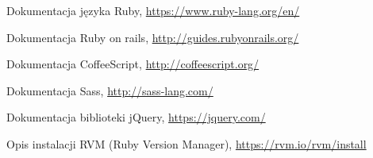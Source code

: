  Dokumentacja języka Ruby, \url{https://www.ruby-lang.org/en/}

 Dokumentacja Ruby on rails, \url{http://guides.rubyonrails.org/}

 Dokumentacja CoffeeScript, \url{http://coffeescript.org/}

 Dokumentacja Sass, \url{http://sass-lang.com/}

 Dokumentacja biblioteki jQuery, \url{https://jquery.com/}

 Opis instalacji RVM (Ruby Version Manager), \url{https://rvm.io/rvm/install }

